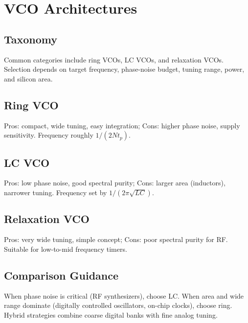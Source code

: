\chapter{VCO Architectures}
\section{Taxonomy}
Common categories include ring VCOs, LC VCOs, and relaxation VCOs. Selection depends on target frequency, phase-noise budget, tuning range, power, and silicon area.
\section{Ring VCO}
Pros: compact, wide tuning, easy integration; Cons: higher phase noise, supply sensitivity. Frequency roughly \(1/(2Nt_p)\).
\section{LC VCO}
Pros: low phase noise, good spectral purity; Cons: larger area (inductors), narrower tuning. Frequency set by \(1/(2\pi\sqrt{LC})\).
\section{Relaxation VCO}
Pros: very wide tuning, simple concept; Cons: poor spectral purity for RF. Suitable for low-to-mid frequency timers.
\section{Comparison Guidance}
When phase noise is critical (RF synthesizers), choose LC. When area and wide range dominate (digitally controlled oscillators, on-chip clocks), choose ring. Hybrid strategies combine coarse digital banks with fine analog tuning.



